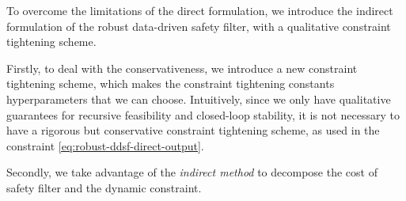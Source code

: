 To overcome the limitations of the direct formulation, we introduce the indirect formulation of the robust data-driven safety filter, with a qualitative constraint tightening scheme.

Firstly, to deal with the conservativeness, we introduce a new constraint tightening scheme, which makes the constraint tightening constants hyperparameters that we can choose.
Intuitively, since we only have qualitative guarantees for recursive feasibility and closed-loop stability, it is not necessary to have a rigorous but conservative constraint tightening scheme, as used in the constraint \cref{eq:robust-ddsf-direct-output}.

Secondly, we take advantage of the \emph{indirect method} \cite{dorflerBridgingDirectIndirect2023} to decompose the cost of safety filter and the dynamic constraint.

